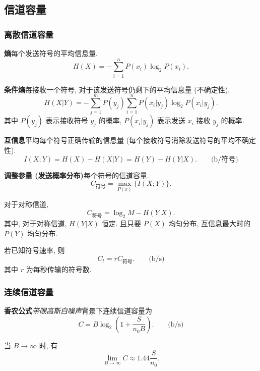 \subsection{信道容量}
\subsubsection{离散信道容量}
\textbf{熵}\quad 每个发送符号的平均信息量.
\begin{equation}
    H(X)=-\sum_{i=1}^{n}P(x_i)\log_2P(x_i).
\end{equation}

\textbf{条件熵}\quad 每接收一个符号, 对于该发送符号仍剩下的平均信息量 (不确定性).
\begin{equation}
    H(X|Y)=-\sum_{j=1}^{m}P(y_j)\sum_{i=1}^{n}P(x_i|y_j)\log_2P(x_i|y_j).
\end{equation}
其中 $P(y_j)$ 表示接收符号 $y_j$ 的概率, $P(x_i|y_j)$ 表示发送 $x_i$ 接收 $y_j$ 的概率.

\textbf{互信息}\quad 平均每个符号正确传输的信息量 (每个接收符号消除发送符号的平均不确定性).
\begin{equation}
    I(X;Y)=H(X)-H(X|Y)=H(Y)-H(Y|X). \qquad \text{(b/符号)}
\end{equation}

\textbf{调整参量 (发送概率分布)}\quad 每个符号的信道容量.
\begin{equation}
    C_\text{符号}=\max_{P(x)}\{I(X;Y)\}.
\end{equation}

对于对称信道,
\begin{equation}
    C_\text{符号}=\log_2M-H(Y|X).
\end{equation}
其中, 对于对称信道, $H(Y|X)$ 恒定. 且只要 $P(X)$ 均匀分布, 互信息最大时的 $P(Y)$ 均匀分布.

若已知符号速率, 则
\begin{equation}
    C_t=rC_\text{符号}. \qquad \text{(b/s)}
\end{equation}
其中 $r$ 为每秒传输的符号数.

\subsubsection{连续信道容量}
\textbf{香农公式}\quad \textit{带限高斯白噪声}背景下连续信道容量为
\begin{equation}
    C=B\log_2\left(1+\frac{S}{n_0B}\right). \qquad \text{(b/s)}
\end{equation}

当 $B\rightarrow\infty$ 时, 有
\begin{equation}
    \lim_{B\rightarrow\infty}C\approx1.44\frac{S}{n_0}.
\end{equation}

